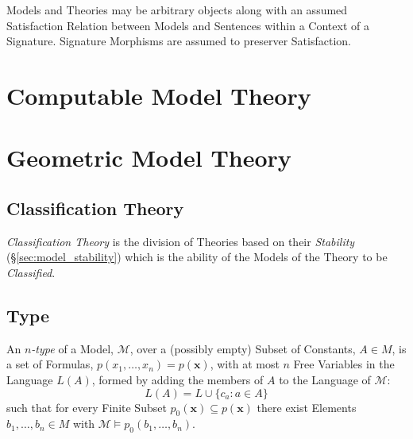 Models and Theories may be arbitrary objects along with an assumed
Satisfaction Relation between Models and Sentences within a Context of
a Signature. Signature Morphisms are assumed to preserver
Satisfaction.



\section{Computable Model Theory}\label{sec:computable_model}
\cite{harizanov98}




\section{Geometric Model Theory}\label{sec:geometric_model}

\subsection{Classification Theory}\label{sec:classification_theory}

\emph{Classification Theory} is the division of Theories based on
their \emph{Stability} (\S\ref{sec:model_stability}) which is the
ability of the Models of the Theory to be \emph{Classified}.



\subsection{Type}\label{sec:model_type}

An \emph{$n$-type} of a Model, $\mathcal{M}$, over a (possibly empty)
Subset of Constants, $A \in M$, is a set of Formulas,
$p(x_1,\ldots,x_n) = p(\mathbf{x})$, with at most $n$ Free Variables
in the Language $L(A)$, formed by adding the members of $A$ to the
Language of $\mathcal{M}$:
\[
  L(A) = L \cup \{ c_a : a \in A \}
\]
such that for every Finite Subset $p_0(\mathbf{x}) \subseteq
p(\mathbf{x})$ there exist Elements $b_1,\ldots,b_n \in M$ with
$\mathcal{M} \models p_0(b_1,\ldots,b_n)$.

